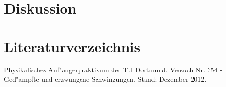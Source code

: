 \newpage
\section{Diskussion}
	\label{sec:diskussion}

\section{Literaturverzeichnis}
	\label{sec:literaturverzeichnis}

	\begin{thebibliography}{9}
		 Physikalisches Anf"angerpraktikum der TU Dortmund: Versuch Nr. 354 - Ged"ampfte und erzwungene Schwingungen. Stand: Dezember 2012.
	\end{thebibliography}

